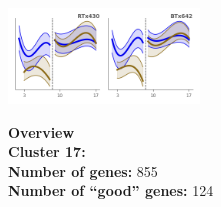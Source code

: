 \begin{multicols}{2}
\includegraphics[width=2in]{figures/clusters/leaf_Preflowering_16.png}
\columnbreak

\noindent \textbf{Overview}\\\textbf{Cluster 17:}  \\
\textbf{Number of genes:} 855 \\
\textbf{Number of ``good'' genes:} 124 \\
\end{multicols}

